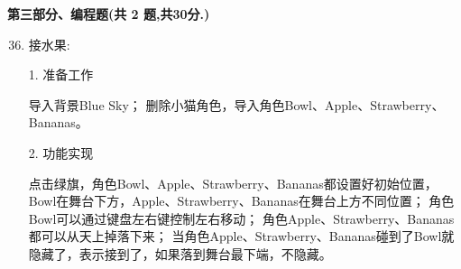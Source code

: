 \documentclass[10pt, a4paper]{article}
\begin{document}
    {\noindent \textbf{第三部分、编程题(共 2 题,共30分.)}}
    \begin{enumerate}
        \setcounter{enumi}{35}
        
        \item 接水果:
        
        1. 准备工作
        \begin{tasks}[label = (\arabic*)]
            \task 导入背景Blue Sky；
            \task 删除小猫角色，导入角色Bowl、Apple、Strawberry、Bananas。
        \end{tasks}
        2. 功能实现
        \begin{tasks}[label = (\arabic*)]
            \task 点击绿旗，角色Bowl、Apple、Strawberry、Bananas都设置好初始位置，Bowl在舞台下方，Apple、Strawberry、Bananas在舞台上方不同位置；
            \task 角色Bowl可以通过键盘左右键控制左右移动；
            \task 角色Apple、Strawberry、Bananas都可以从天上掉落下来；
            \task 当角色Apple、Strawberry、Bananas碰到了Bowl就隐藏了，表示接到了，如果落到舞台最下端，不隐藏。
        \end{tasks}


\end{enumerate}
\end{document}
